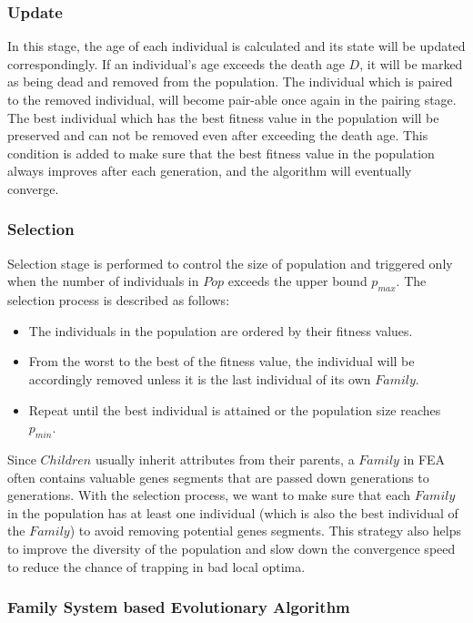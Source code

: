 \documentclass[final]{elsarticle}
\begin{document}
\subsubsection{Update}

In this stage, the age of each individual is calculated and its state will be updated correspondingly. If an individual's age exceeds the death age $D$, it will be marked as being dead and removed from the population. The individual which is paired to the removed individual, will become pair-able once again in the pairing stage. The best individual which has the best fitness value in the population will be preserved and can not be removed even after exceeding the death age. This condition is added to make sure that the best fitness value in the population always improves after each generation, and the algorithm will eventually converge.

\subsubsection{Selection}

Selection stage is performed to control the size of population and triggered only when the number of individuals in $Pop$ exceeds the upper bound $p_{max}$. The selection process is described as follows: 
\begin{itemize}
	\item The individuals in the population are ordered by their fitness values. 
	\item From the worst to the best of the fitness value, the individual will be accordingly removed unless it is the last individual of its own $ Family $. 
	\item Repeat until the best individual is attained or the population size reaches $p_{min}$.
\end{itemize}
Since $Children$ usually inherit attributes from their parents, a $Family$ in FEA often contains valuable genes segments that are passed down generations to generations. With the selection process, we want to make sure that each $ Family $ in the population has at least one individual (which is also the best individual of the $ Family $) to avoid removing potential genes segments. This strategy also helps to improve the diversity of the population and slow down the convergence speed to reduce the chance of trapping in bad local optima.

\subsubsection{Family System based Evolutionary Algorithm}
\end{document}
